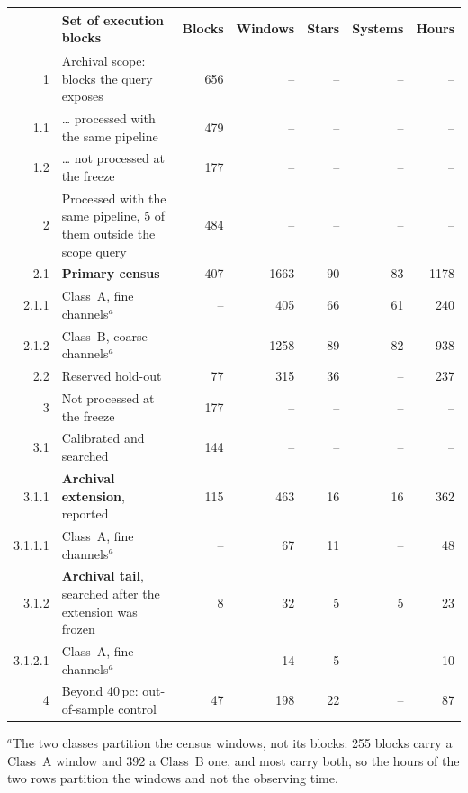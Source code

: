 \begin{tabular}{@{}r@{~}p{}rrrrr@{}}
\hline
 & Set of execution blocks & Blocks & Windows & Stars & Systems & Hours \\
\hline
1 & Archival scope: blocks the query exposes & 656 & -- & -- & -- & -- \\
1.1 & \hspace{0.8em}\ldots{} processed with the same pipeline & 479 & -- & -- & -- & -- \\
1.2 & \hspace{0.8em}\ldots{} not processed at the freeze & 177 & -- & -- & -- & -- \\
\hline
2 & Processed with the same pipeline, 5 of them outside the scope query & 484 & -- & -- & -- & -- \\
2.1 & \hspace{0.8em}\textbf{Primary census} & 407 & 1663 & 90 & 83 & 1178 \\
2.1.1 & \hspace{1.6em}Class~A, fine channels$^{a}$ & -- & 405 & 66 & 61 & 240 \\
2.1.2 & \hspace{1.6em}Class~B, coarse channels$^{a}$ & -- & 1258 & 89 & 82 & 938 \\
2.2 & \hspace{0.8em}Reserved hold-out & 77 & 315 & 36 & -- & 237 \\
\hline
3 & Not processed at the freeze & 177 & -- & -- & -- & -- \\
3.1 & \hspace{0.8em}Calibrated and searched & 144 & -- & -- & -- & -- \\
3.1.1 & \hspace{1.6em}\textbf{Archival extension}, reported & 115 & 463 & 16 & 16 & 362 \\
3.1.1.1 & \hspace{2.4em}Class~A, fine channels$^{a}$ & -- & 67 & 11 & -- & 48 \\
3.1.2 & \hspace{1.6em}\textbf{Archival tail}, searched after the extension was frozen & 8 & 32 & 5 & 5 & 23 \\
3.1.2.1 & \hspace{2.4em}Class~A, fine channels$^{a}$ & -- & 14 & 5 & -- & 10 \\
\hline
4 & Beyond 40\,pc: out-of-sample control & 47 & 198 & 22 & -- & 87 \\
\hline
\end{tabular}

{\footnotesize\raggedright $^{a}$The two classes partition the census windows, not its blocks: 255 blocks carry a Class~A window and 392 a Class~B one, and most carry both, so the hours of the two rows partition the windows and not the observing time.}
